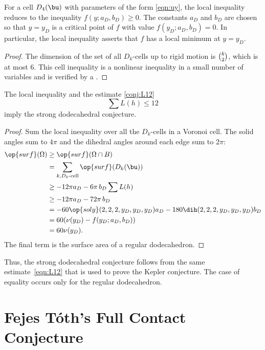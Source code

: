 For a cell $D_4(\bu)$ with parameters of the form
  \eqref{eqn:uy}, the local inequality reduces to the inequality
  $f(y;a_D,b_D)\ge 0$.  The constants $a_D$ and $b_D$ are chosen so that
  $y=y_D$ is a critical point of $f$ with value $f(y_D;a_D,b_D)=0$.  In
  particular, the local inequality asserts that $f$ has a local
  minimum at $y=y_D$.


\begin{proof} 
  The dimension of the set of all $D_k$-cells up to rigid motion 
is $\tbinom{k}{2}$, which is at most $6$.  
This cell inequality is a nonlinear inequality in a small number of variables
and is verified by a 
.  %
\end{proof}

\begin{lemma}[]
  The local inequality and the estimate \eqref{conj:L12}
\[
\sum L(h) \le 12
\]
imply the strong dodecahedral conjecture.
\end{lemma}

\begin{proof} 
  Sum the local inequality over all the $D_k$-cells in a Voronoi cell.
  The solid angles sum to $4\pi$ and the dihedral angles around each
  edge sum to $2\pi$:
\begin{align*}
  \op{surf}(\Omega) &\ge \op{surf}(\Omega\cap B)\\
  &=\sum_{k,D_k\text{-cell}} \op{surf}(D_k(\bu))\\
  &\ge -12\pi a_D - 6\pi\, b_D  \sum L(h)\\
  &\ge -12\pi a_D - 72\pi\, b_D\\
  &= -60 \op{soly}(2,2,2,y_D,y_D,y_D) a_D - 180 \dih(2,2,2,y_D,y_D,y_D) b_D\\
  &= 60 (\nu(y_D) - f(y_D;a_D,b_D))\\
  &= 60 \nu(y_D).\\
\end{align*}
The final term is the surface area of a regular dodecahedron.
\end{proof}

Thus, the strong dodecahedral conjecture follows from the same
estimate~\eqref{eqn:L12} that is used to prove the Kepler conjecture.
The case of equality occurs only for the regular dodecahedron.

\newpage
\section{Fejes T\'oth's Full Contact Conjecture}


